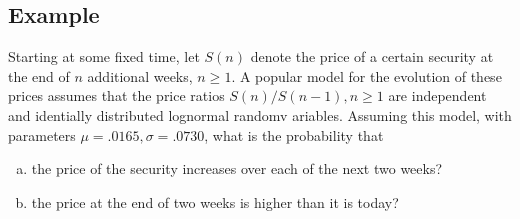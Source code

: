 \subsection*{Example}
Starting at some fixed time, let $S(n)$ denote the price of a certain security at the end of $n$ additional weeks, $n\geq 1$. A popular model for the evolution of these prices assumes that the price ratios $S(n)/S(n-1), n\geq 1$ are independent and identially distributed lognormal randomv ariables. Assuming this model, with parameters $\mu = .0165, \sigma = .0730$, what is the probability that \begin{enumerate}[a. ]
    \item the price of the security increases over each of the next two weeks?
    \item the price at the end of two weeks is higher than it is today?
\end{enumerate}
